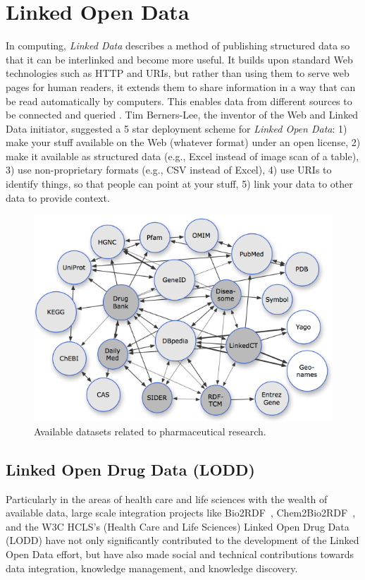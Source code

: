 \documentclass[conference]{IEEEtran}
\begin{document}
\section{Linked Open Data}
\label{sec:lod}
In computing, \emph{Linked Data} describes a method of publishing structured data so that it can be interlinked and become more useful.
It builds upon standard Web technologies such as HTTP and URIs, but rather than using them to serve web pages for human readers, it extends them to share information in a way that can be read automatically by computers.
This enables data from different sources to be connected and queried \cite{linkeddata}.
Tim Berners-Lee, the inventor of the Web and Linked Data initiator, suggested a 5 star deployment scheme for \emph{Linked Open Data}:
1) make your stuff available on the Web (whatever format) under an open license,
2) make it available as structured data (e.g., Excel instead of image scan of a table),
3) use non-proprietary formats (e.g., CSV instead of Excel),
4) use URIs to identify things, so that people can point at your stuff,
5) link your data to other data to provide context.

\begin{figure}[tb]
	\centering
		\includegraphics[width=1.0\columnwidth]{images/lod_cloud.png}
	\caption{Available datasets related to pharmaceutical research.}
	\label{fig:lod}
\end{figure}

\subsection{Linked Open Drug Data (LODD)}
Particularly in the areas of health care and life sciences with the wealth of available data, large scale integration projects like Bio2RDF~\cite{bio2rdf}, Chem2Bio2RDF~\cite{chembio}, and the W3C HCLS’s (Health Care and Life Sciences) Linked Open Drug Data (LODD)\cite{lodd} have not only significantly contributed to the development of the Linked Open Data effort, but have also made social and technical contributions towards data integration, knowledge management, and knowledge discovery.
\end{document}

